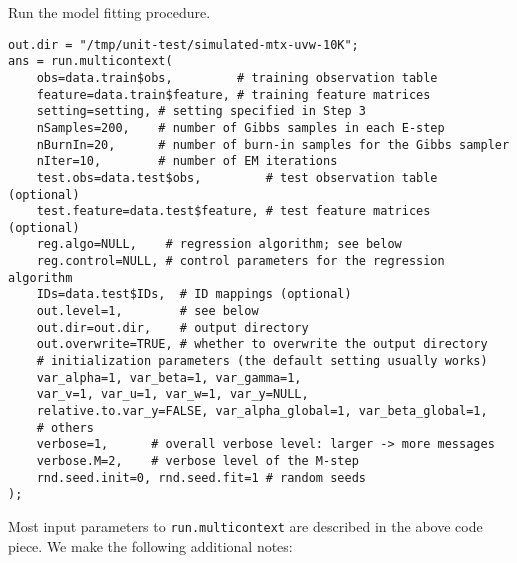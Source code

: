 \documentclass[10pt]{article}
\newcommand{\parahead}[1]{\vspace{0.15in}\noindent{\bf #1:}}
\begin{document}
\parahead{Step 4}
Run the model fitting procedure.
{\small\begin{verbatim}
out.dir = "/tmp/unit-test/simulated-mtx-uvw-10K";
ans = run.multicontext(
    obs=data.train$obs,         # training observation table
    feature=data.train$feature, # training feature matrices
    setting=setting, # setting specified in Step 3
    nSamples=200,    # number of Gibbs samples in each E-step
    nBurnIn=20,      # number of burn-in samples for the Gibbs sampler
    nIter=10,        # number of EM iterations
    test.obs=data.test$obs,         # test observation table (optional)
    test.feature=data.test$feature, # test feature matrices  (optional)
    reg.algo=NULL,    # regression algorithm; see below
    reg.control=NULL, # control parameters for the regression algorithm
    IDs=data.test$IDs,  # ID mappings (optional)
    out.level=1,        # see below
    out.dir=out.dir,    # output directory
    out.overwrite=TRUE, # whether to overwrite the output directory
    # initialization parameters (the default setting usually works)
    var_alpha=1, var_beta=1, var_gamma=1, 
    var_v=1, var_u=1, var_w=1, var_y=NULL,
    relative.to.var_y=FALSE, var_alpha_global=1, var_beta_global=1,
    # others
    verbose=1,      # overall verbose level: larger -> more messages
    verbose.M=2,    # verbose level of the M-step
    rnd.seed.init=0, rnd.seed.fit=1 # random seeds
);
\end{verbatim}}
\noindent Most input parameters to {\tt run.multicontext} are described in the above code piece. We make the following additional notes:
\end{document}
